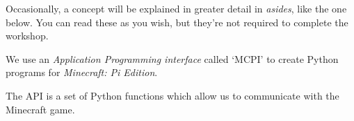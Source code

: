 Occasionally, a concept will be explained in greater detail in \textit{asides}, like the one below. You can read these as you wish, but they're not required to complete the workshop.
	
\begin{aside}[API]
	We use an \textit{Application Programming interface} called `MCPI' to create Python programs for \textit{Minecraft: Pi Edition}.
	
	The API is a set of Python functions which allow us to communicate with the Minecraft game.
\end{aside}